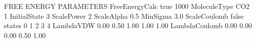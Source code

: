 \documentclass[letterpaper,10pt,english]{sphinxmanual}
\begin{document}
\begin{sphinxVerbatim}[commandchars=\\\{\}]
\PYGZsh{}\PYGZsh{}\PYGZsh{}\PYGZsh{}\PYGZsh{}\PYGZsh{}\PYGZsh{}\PYGZsh{}\PYGZsh{}\PYGZsh{}\PYGZsh{}\PYGZsh{}\PYGZsh{}\PYGZsh{}\PYGZsh{}\PYGZsh{}\PYGZsh{}\PYGZsh{}\PYGZsh{}\PYGZsh{}\PYGZsh{}\PYGZsh{}\PYGZsh{}\PYGZsh{}\PYGZsh{}\PYGZsh{}\PYGZsh{}\PYGZsh{}\PYGZsh{}\PYGZsh{}\PYGZsh{}\PYGZsh{}\PYGZsh{}
\PYGZsh{} FREE ENERGY PARAMETERS
\PYGZsh{}\PYGZsh{}\PYGZsh{}\PYGZsh{}\PYGZsh{}\PYGZsh{}\PYGZsh{}\PYGZsh{}\PYGZsh{}\PYGZsh{}\PYGZsh{}\PYGZsh{}\PYGZsh{}\PYGZsh{}\PYGZsh{}\PYGZsh{}\PYGZsh{}\PYGZsh{}\PYGZsh{}\PYGZsh{}\PYGZsh{}\PYGZsh{}\PYGZsh{}\PYGZsh{}\PYGZsh{}\PYGZsh{}\PYGZsh{}\PYGZsh{}\PYGZsh{}\PYGZsh{}\PYGZsh{}\PYGZsh{}\PYGZsh{}
FreeEnergyCalc true   1000
MoleculeType   CO2   1
InitialState   3
ScalePower     2
ScaleAlpha     0.5
MinSigma       3.0
ScaleCoulomb   false
\PYGZsh{}states        0    1    2    3    4
LambdaVDW      0.00 0.50 1.00 1.00 1.00
LambdaCoulomb  0.00 0.00 0.00 0.50 1.00
\end{sphinxVerbatim}
\end{document}
